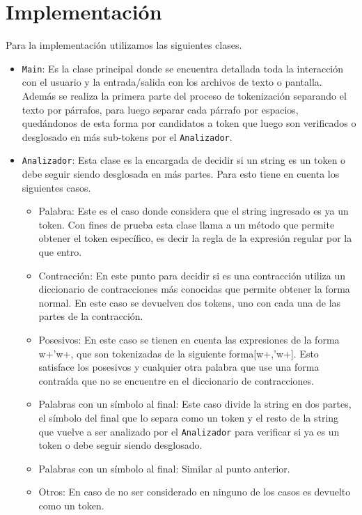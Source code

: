\section{Implementaci\'on}

Para la implementaci\'on utilizamos las siguientes clases.

\begin{itemize}
	\item \texttt{Main}: Es la clase principal donde se encuentra detallada toda la interacci\'on con el usuario y la entrada/salida con los archivos de texto o pantalla. Adem\'as se realiza la primera parte del proceso de tokenizaci\'on separando el texto por p\'arrafos, para luego separar cada p\'arrafo por espacios, qued\'andonos de esta forma por candidatos a token que luego son verificados o desglosado en m\'as sub-tokens  por el \texttt{Analizador}. 
	\item \texttt{Analizador}: Esta clase es la encargada de decidir si un string es un token o debe seguir siendo desglosada en m\'as partes. Para esto tiene en cuenta los siguientes casos. 
		\begin{itemize}
			\item Palabra: Este es el caso donde considera que el string ingresado es ya un token. Con fines de prueba esta clase llama a un m\'etodo que permite obtener el token espec\'ifico, es decir la regla de la expresi\'on regular por la que entro. 
			\item Contracci\'on:  En este punto para decidir si es una contracci\'on utiliza un diccionario de contracciones m\'as conocidas que permite obtener la forma normal. En este caso se devuelven dos tokens, uno con cada una de las partes de la contracci\'on. 
			\item Posesivos: En este caso se tienen en cuenta las expresiones de la forma w+'w+, que son tokenizadas de la siguiente forma[w+,'w+]. Esto satisface los posesivos y cualquier otra palabra que use una forma contra\'ida que no se encuentre en el diccionario de contracciones. 
			\item Palabras con un s\'imbolo al final: Este caso divide la string en dos partes, el s\'imbolo del final que lo separa como un token y el resto de la string que vuelve a ser analizado por el \texttt{Analizador} para verificar si ya es un token o debe seguir siendo desglosado. 			
			\item Palabras con un s\'imbolo al final: Similar al punto anterior. 
			\item Otros: En caso de no ser considerado en ninguno de los casos es devuelto como un token. 

\end{itemize}
\end{itemize}
